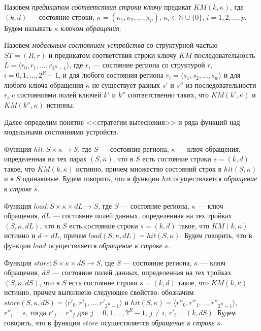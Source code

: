 Назовем \emph{предикатом соответствия строки ключу} предикат $KM(k, \kappa)$, где $(k,d)$ --- состояние строки, $\kappa = (\kappa_1, \kappa_2, ..., \kappa_p)$, $\kappa_i \in \mathds{N} \cup \{0\}$, $i = 1, 2, ..., p$. Будем называть $\kappa$ \emph{ключом обращения}.

Назовем \emph{модельным состоянием устройства} со структурной частью $ST = (R, r)$ и предикатом соответствия строки ключу $KM$ последовательность $L = \langle r_0, r_1, ..., r_{2^R-1} \rangle$, где $r_i$ --- состояние региона со структурой $r$, $i = 0, 1, ..., 2^R{-}1$, и для любого состояния региона $r_i = \langle s_1, s_2, ..., s_w \rangle$ и для любого ключа обращения $\kappa$ не существует разных $s'$ и $s''$ из последовательности $r_i$ c состояниями полей ключей $k'$ и $k''$ соответственно таких, что $KM(k', \kappa)$ и $KM(k'', \kappa)$ истинны.



Далее определим понятие <<стратегии вытеснения>> и ряда функций над модельными состояниями устройств.

Функция $hit: S \times \kappa \rightarrow S$, где $S$ --- состояние региона, $\kappa$ --- ключ обращения, определенная на тех парах $(S, \kappa)$, что в $S$ есть состояние строки $s = (k,d)$ такое, что $KM(k, \kappa)$ истинно, причем множество состояний строк в $hit(S, \kappa)$ и в $S$ одинаковые. Будем говорить, что в функции $hit$ осуществляется \emph{обращение к строке} $s$.

Функция $load: S \times \kappa \times dL \rightarrow S$, где $S$ --- состояние региона, $\kappa$ --- ключ обращения, $dL$ --- состояние полей данных, определенная на тех тройках $(S, \kappa, dL)$, что в $S$ есть состояние строки $s = (k,d)$ такое, что $KM(k, \kappa)$ истинно и $d = dL$, причем $load(S, \kappa, dL) = hit(S, \kappa)$. Будем говорить, что в функции $load$ осуществляется \emph{обращение к строке} $s$.

Функция $store: S \times \kappa \times dS \rightarrow S$, где $S$ --- состояние региона, $\kappa$ --- ключ обращения, $dS$ --- состояние полей данных, определенная на тех тройках $(S, \kappa, dS)$, что в $S$ есть состояние строки $s = (k,d)$ такое, что $KM(k, \kappa)$ истинно, причем выполнено следующее свойство: обозначим $store(S, \kappa, dS) = \langle r'_0, r'_1, ..., r'_{2^R-1}\rangle$ и $hit(S, \kappa) = \langle r''_0, r''_1, ..., r''_{2^R-1}\rangle$, $r''_i = s$, тогда $r'_j = r''_j$ для $j = 0, 1, ..., 2^R{-}1$, $j \neq i$, $r'_i = (k, dS)$. Будем говорить, что в функции $store$ осуществляется \emph{обращение к строке} $s$.


